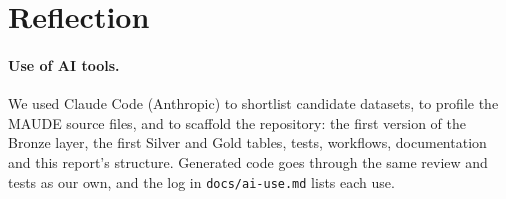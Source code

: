 \section{Reflection}
\label{sec:reflection}


\paragraph{Use of AI tools.}
We used Claude Code (Anthropic) to shortlist candidate datasets, to profile the MAUDE source
files, and to scaffold the repository: the first version of the Bronze layer, the first Silver
and Gold tables, tests, workflows, documentation and this report's structure. Generated code goes
through the same review and tests as our own, and the log in \texttt{docs/ai-use.md} lists each
use.
